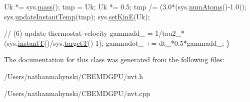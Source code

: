 \begin{DoxyCode}
    Uk *= sys.\hyperlink{classsystem_definition_acb6dd3df121e3e5bc0eb41c32bd937bd}{mass}();
    tmp = Uk;
    Uk *= 0.5;
    tmp /= (3.0*(sys.\hyperlink{classsystem_definition_ae8d3c2df2d56241cee03fcc4e2026ae0}{numAtoms}()-1.0));
    sys.\hyperlink{classsystem_definition_a285e6cd1de35ed125eecb20f0f774ab3}{updateInstantTemp}(tmp);
    sys.\hyperlink{classsystem_definition_a2b2c236698886bd1d106be802b987b61}{setKinE}(Uk);

    \textcolor{comment}{// (6) update thermostat velocity}
    gammadd\_ = 1/tau2\_*(sys.\hyperlink{classsystem_definition_af7b322cfc8abe7042fdbeb0af8e7aa7e}{instantT}()/sys.\hyperlink{classsystem_definition_a3c958df2ab99c0cb75c740346a5a4b6f}{targetT}()-1);
    gammadot\_ += dt\_*0.5*gammadd\_;
\}
\end{DoxyCode}


The documentation for this class was generated from the following files\-:\begin{DoxyCompactItemize}
\item 
/\-Users/nathanmahynski/\-C\-B\-E\-M\-D\-G\-P\-U/nvt.\-h\item 
/\-Users/nathanmahynski/\-C\-B\-E\-M\-D\-G\-P\-U/nvt.\-cpp\end{DoxyCompactItemize}
